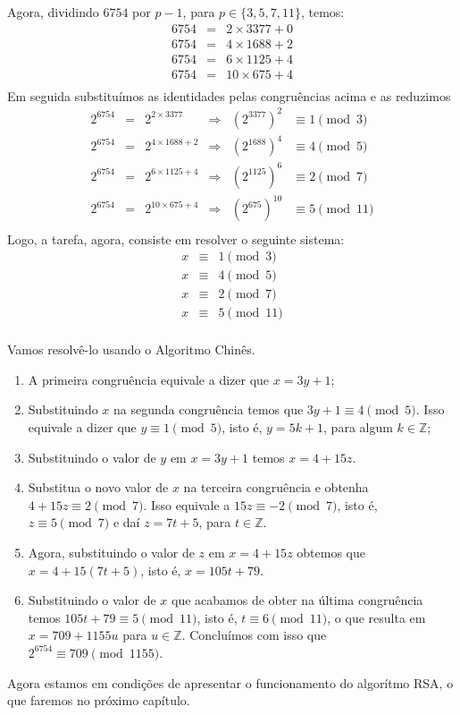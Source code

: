 Agora, dividindo $6754$ por $p-1$, para $p\in\{3, 5, 7, 11\}$, temos:
\[
\begin{array}{ccl}
  6754 & = & 2 \times 3377 + 0 \\  
	6754 & = & 4 \times 1688 + 2 \\
  6754 & = & 6 \times 1125 + 4 \\
  6754 & = & 10 \times 675 + 4 \\ 
\end{array}
\]
Em seguida substitu\'imos as identidades pelas congru\^encias acima e as reduzimos
\[
\begin{array}{cccccc}
2^{6754} & = & 2^{2\times 3377}   & \Rightarrow & (2^{3377})^{2} & \equiv 1 \pmod{3} \\  
2^{6754} & = & 2^{4\times 1688+2} & \Rightarrow & (2^{1688})^{4} & \equiv 4 \pmod{5}\\  
2^{6754} & = & 2^{6\times 1125+4} & \Rightarrow & (2^{1125})^{6} & \equiv 2 \pmod{7}\\ 
2^{6754} & = & 2^{10\times 675+4} & \Rightarrow & (2^{675})^{10} & \equiv 5 \pmod{11}\\  
\end{array}
\]
Logo, a tarefa, agora, consiste em resolver o seguinte sistema:
\[
\begin{array}{ccc}
  x & \equiv & 1 \pmod{3}\\
  x & \equiv & 4 \pmod{5}\\
  x & \equiv & 2 \pmod{7}\\
  x & \equiv & 5 \pmod{11}\\  
\end{array}
\]

Vamos resolv\^e-lo usando o Algoritmo Chin\^{e}s. 
\begin{enumerate}
\item A primeira congru\^{e}ncia equivale a dizer que $x = 3y + 1$; 
\item Substituindo $x$ na segunda congru\^encia temos que $3y + 1 \equiv 4 \pmod{5}$. Isso equivale a dizer que $y \equiv 1 \pmod{5}$, 
isto \'{e}, $y=5k+1$, para algum $k\in\mathbb{Z}$; 
\item Substituindo o valor de $y$ em $x=3y+1$ temos $x=4+15z$.
\item Substitua o novo valor de $x$ na terceira congru\^{e}ncia e obtenha $4+15z\equiv 2\pmod{7}$. Isso equivale a
      $15z\equiv -2\pmod{7}$, isto \'{e}, $z\equiv 5\pmod{7}$ e da\'{i} $z=7t+5$, para $t\in\mathbb{Z}$.
\item Agora, substituindo o valor de $z$ em $x=4+15z$ obtemos que $x=4+15(7t+5)$, isto \'{e}, $x=105t+79$.
\item Substituindo o valor de $x$ que acabamos de obter na \'{u}ltima congru\^{e}ncia temos 
      $105t+79\equiv 5 \pmod{11}$, isto \'{e},  $t\equiv 6 \pmod{11}$, o que resulta em 
				$x = 709+1155u$ para $u\in\mathbb{Z}$. Conclu\'imos com isso que $2^{6754} \equiv 709 \pmod{1155}$.
\end{enumerate}

Agora estamos em condi\c{c}\~{o}es de apresentar o funcionamento do algor\'{i}tmo RSA, o que faremos no pr\'{o}ximo cap\'{i}tulo. 